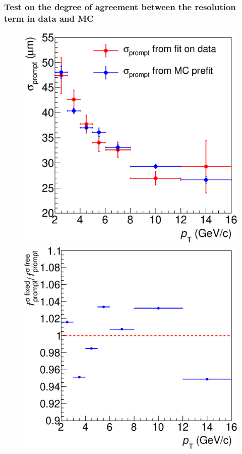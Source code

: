 \documentclass[b5paper,10pt,twoside,oldstyle,classica]{toptesi}
\begin{document}
\subsubsection{Test on the degree of agreement between the resolution term in data and MC}
\label{sigma_syst_sec}
\begin{figure}[b]
\begin{center}
{\includegraphics[scale = 0.32]{sigmaprompt.eps}}
\hspace{-0.6cm}
{\includegraphics[scale = 0.32]{promptfraction_syst_sigma_onlyratio.eps}}

\end{center}
\end{figure}
\end{document}
